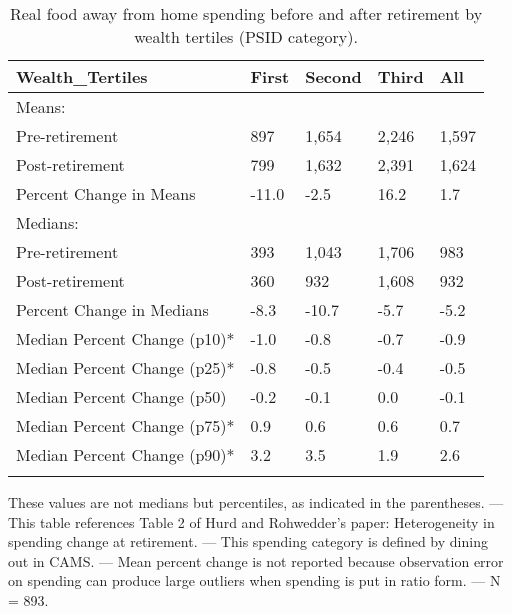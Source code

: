 \begin{table}[tbp] \centering
{}

\caption{Real food away from home spending before and after retirement by wealth tertiles (PSID category).}
\begin{tabularx}{\textwidth}{lCCCC}

\toprule
{Wealth\_Tertiles}&{First}&{Second}&{Third}&{All} \tabularnewline
\midrule\addlinespace[1.5ex]
Means:&&&& \tabularnewline
\midrule Pre-retirement&897&1,654&2,246&1,597 \tabularnewline
Post-retirement&799&1,632&2,391&1,624 \tabularnewline
Percent Change in Means&-11.0&-2.5&16.2&1.7 \tabularnewline
\midrule Medians:&&&& \tabularnewline
\midrule Pre-retirement&393&1,043&1,706&983 \tabularnewline
Post-retirement&360&932&1,608&932 \tabularnewline
Percent Change in Medians&-8.3&-10.7&-5.7&-5.2 \tabularnewline
Median Percent Change (p10)*&-1.0&-0.8&-0.7&-0.9 \tabularnewline
Median Percent Change (p25)*&-0.8&-0.5&-0.4&-0.5 \tabularnewline
Median Percent Change (p50)&-0.2&-0.1&0.0&-0.1 \tabularnewline
Median Percent Change (p75)*&0.9&0.6&0.6&0.7 \tabularnewline
Median Percent Change (p90)*&3.2&3.5&1.9&2.6 \tabularnewline
\bottomrule \addlinespace[1.5ex]

\end{tabularx}
\begin{flushleft}
\footnotesize *These values are not medians but percentiles, as indicated in the parentheses. \linebreak --- \linebreak This table references Table 2 of Hurd and Rohwedder's paper: Heterogeneity in spending change at retirement. \linebreak --- \linebreak This spending category is defined by dining out in CAMS. \linebreak --- \linebreak Mean percent change is not reported because observation error on spending can produce large outliers when spending is put in ratio form. \linebreak --- \linebreak N = 893.
\end{flushleft}
\end{table}
